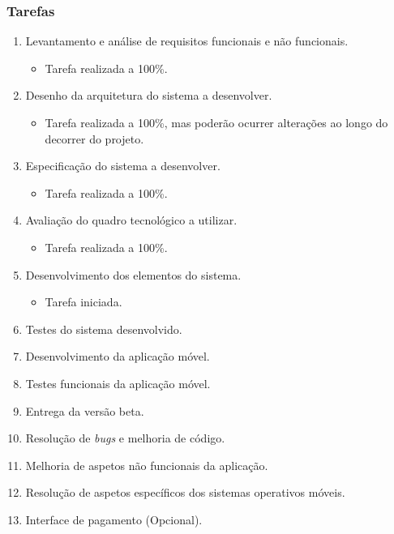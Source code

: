 \documentclass{article}
\begin{document}
\hypertarget{_tarefas}{%
\subsubsection{Tarefas}\label{_tarefas}}

\begin{enumerate}
\def\labelenumi{\arabic{enumi}.}
\item
  Levantamento e análise de requisitos funcionais e não funcionais.

  \begin{itemize}
  \item
    Tarefa realizada a 100\%.
  \end{itemize}
\item
  Desenho da arquitetura do sistema a desenvolver.

  \begin{itemize}
  \item
    Tarefa realizada a 100\%, mas poderão ocurrer alterações ao longo do
    decorrer do projeto.
  \end{itemize}
\item
  Especificação do sistema a desenvolver.

  \begin{itemize}
  \item
    Tarefa realizada a 100\%.
  \end{itemize}
\item
  Avaliação do quadro tecnológico a utilizar.

  \begin{itemize}
  \item
    Tarefa realizada a 100\%.
  \end{itemize}
\item
  Desenvolvimento dos elementos do sistema.

  \begin{itemize}
  \item
    Tarefa iniciada.
  \end{itemize}
\item
  Testes do sistema desenvolvido.
\item
  Desenvolvimento da aplicação móvel.
\item
  Testes funcionais da aplicação móvel.
\item
  Entrega da versão beta.
\item
  Resolução de \emph{bugs} e melhoria de código.
\item
  Melhoria de aspetos não funcionais da aplicação.
\item
  Resolução de aspetos específicos dos sistemas operativos móveis.
\item
  Interface de pagamento (Opcional).
\end{enumerate}
\end{document}
